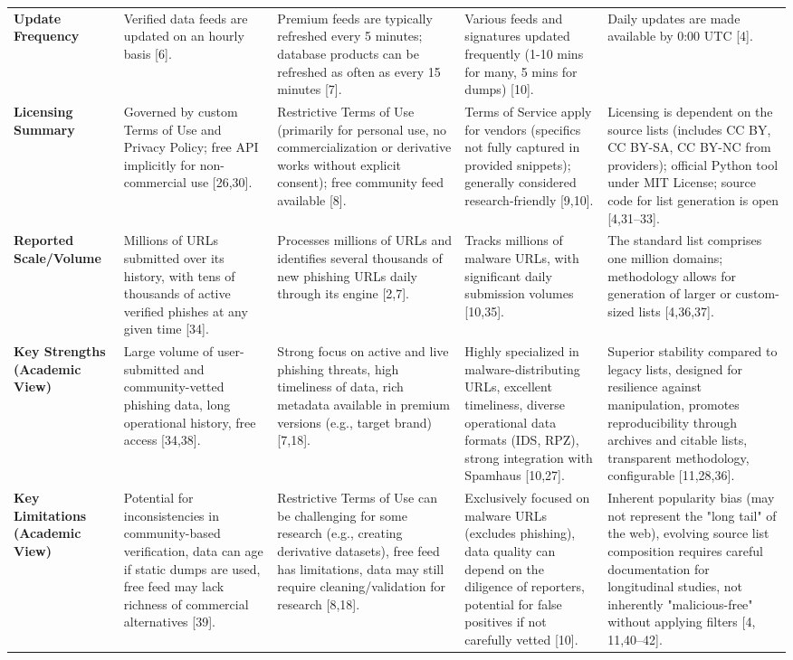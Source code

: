 \documentclass[journal,article,submit,pdftex,moreauthors]{Definitions/mdpi}
\begin{document}
\begin{table}[H]
\begin{tabularx}{\textwidth}{lXXXX}
\textbf{Update Frequency} & Verified data feeds are updated on an hourly basis [6]. & Premium feeds are typically refreshed every 5 minutes; database products can be refreshed as often as every 15 minutes [7]. & Various feeds and signatures updated frequently (1-10 mins for many, 5 mins for dumps) [10]. & Daily updates are made available by 0:00 UTC [4].\\
\textbf{Licensing Summary} & Governed by custom Terms of Use and Privacy Policy; free API implicitly for non-commercial use [26,30]. & Restrictive Terms of Use (primarily for personal use, no commercialization or derivative works without explicit consent); free community feed available [8]. & Terms of Service apply for vendors (specifics not fully captured in provided snippets); generally considered research-friendly [9,10]. & Licensing is dependent on the source lists (includes CC BY, CC BY-SA, CC BY-NC from providers); official Python tool under MIT License; source code for list generation is open [4,31–33].\\
\textbf{Reported Scale/Volume} & Millions of URLs submitted over its history, with tens of thousands of active verified phishes at any given time [34]. & Processes millions of URLs and identifies several thousands of new phishing URLs daily through its engine [2,7]. & Tracks millions of malware URLs, with significant daily submission volumes [10,35]. & The standard list comprises one million domains; methodology allows for generation of larger or custom-sized lists [4,36,37].\\
\textbf{Key Strengths (Academic View)} & Large volume of user-submitted and community-vetted phishing data, long operational history, free access [34,38]. & Strong focus on active and live phishing threats, high timeliness of data, rich metadata available in premium versions (e.g., target brand) [7,18]. & Highly specialized in malware-distributing URLs, excellent timeliness, diverse operational data formats (IDS, RPZ), strong integration with Spamhaus [10,27]. & Superior stability compared to legacy lists, designed for resilience against manipulation, promotes reproducibility through archives and citable lists, transparent methodology, configurable [11,28,36].\\
\textbf{Key Limitations (Academic View)} & Potential for inconsistencies in community-based verification, data can age if static dumps are used, free feed may lack richness of commercial alternatives [39]. & Restrictive Terms of Use can be challenging for some research (e.g., creating derivative datasets), free feed has limitations, data may still require cleaning/validation for research [8,18]. & Exclusively focused on malware URLs (excludes phishing), data quality can depend on the diligence of reporters, potential for false positives if not carefully vetted [10]. & Inherent popularity bias (may not represent the "long tail" of the web), evolving source list composition requires careful documentation for longitudinal studies, not inherently "malicious-free" without applying filters [4, 11,40–42].\\
\bottomrule
\end{tabularx}
\end{table}

\end{document}
